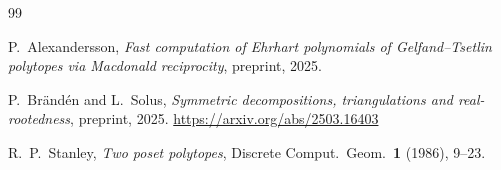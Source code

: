 \documentclass[11pt,reqno]{amsart}
\theoremstyle{definition}
\begin{document}
\begin{thebibliography}{99}

P.~Alexandersson,
\emph{Fast computation of Ehrhart polynomials of
Gelfand--Tsetlin polytopes via Macdonald reciprocity},
preprint, 2025.

P.~Br\"and\'en and L.~Solus,
\emph{Symmetric decompositions, triangulations and
real-rootedness},
preprint, 2025.
\url{https://arxiv.org/abs/2503.16403}

R.~P.~Stanley,
\emph{Two poset polytopes},
Discrete Comput.\ Geom.\ \textbf{1} (1986), 9--23.

\end{thebibliography}
\end{document}
